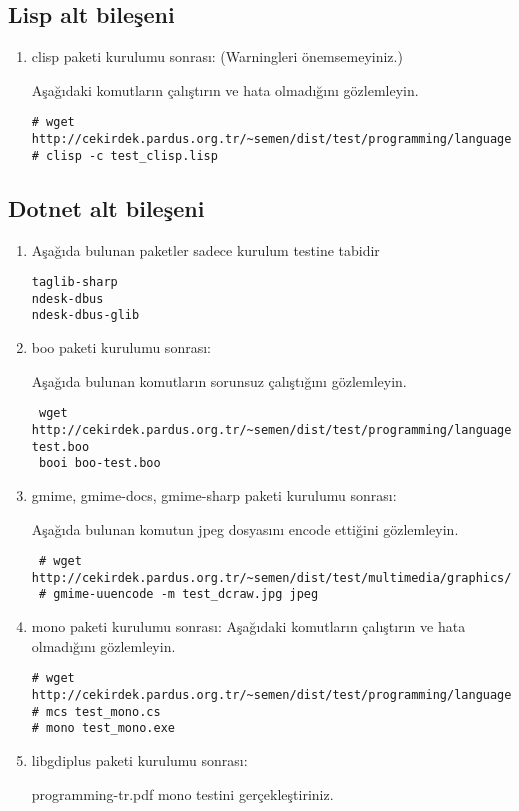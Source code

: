 \documentclass[a4paper,10pt]{article}
\begin{document}
\subsection{Lisp alt bileşeni}
\begin{enumerate}
 \item clisp paketi kurulumu sonrası: (Warningleri önemsemeyiniz.)

Aşağıdaki komutların çalıştırın ve hata olmadığını gözlemleyin.
\begin{verbatim}
# wget http://cekirdek.pardus.org.tr/~semen/dist/test/programming/language/lisp/test_clisp.lisp 
# clisp -c test_clisp.lisp
\end{verbatim}

\end{enumerate}
\subsection{Dotnet alt bileşeni}
\begin{enumerate}

\item Aşağıda bulunan paketler sadece kurulum testine tabidir
\begin{verbatim}
taglib-sharp
ndesk-dbus
ndesk-dbus-glib
\end{verbatim}
\item boo paketi kurulumu sonrası:

Aşağıda bulunan komutların sorunsuz çalıştığını gözlemleyin.
\begin{verbatim}
 wget http://cekirdek.pardus.org.tr/~semen/dist/test/programming/language/dotnet/boo-test.boo
 booi boo-test.boo
\end{verbatim}


 \item gmime, gmime-docs, gmime-sharp paketi kurulumu sonrası:

Aşağıda bulunan komutun jpeg dosyasını encode ettiğini gözlemleyin.
\begin{verbatim}
 # wget http://cekirdek.pardus.org.tr/~semen/dist/test/multimedia/graphics/test_dcraw.jpg
 # gmime-uuencode -m test_dcraw.jpg jpeg
\end{verbatim}


 \item mono paketi kurulumu sonrası:
Aşağıdaki komutların çalıştırın ve hata olmadığını gözlemleyin.
\begin{verbatim}
# wget http://cekirdek.pardus.org.tr/~semen/dist/test/programming/language/dotnet/test_mono.cs
# mcs test_mono.cs
# mono test_mono.exe
\end{verbatim}

\item libgdiplus paketi kurulumu sonrası:

programming-tr.pdf mono testini gerçekleştiriniz.

\end{enumerate}
\end{document}
